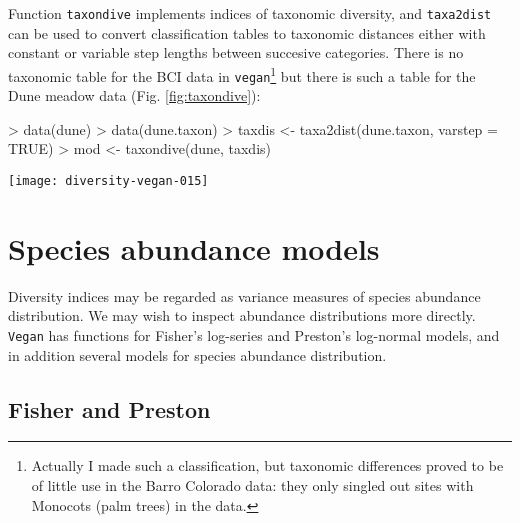 \documentclass[a4paper,10pt]{amsart}
\begin{document}
Function \texttt{taxondive} implements indices of taxonomic diversity,
and \texttt{taxa2dist} can be used to convert classification tables to
taxonomic distances either with constant or variable step lengths
between succesive categories. There is no taxonomic table for the BCI
data in \texttt{vegan}\footnote{Actually I made such a classification,
  but taxonomic differences proved to be of little use in the Barro
  Colorado data: they only singled out sites with Monocots (palm
  trees) in the data.}
but there is such a table for the Dune meadow data (Fig. \ref{fig:taxondive}):
\begin{Schunk}
\begin{Sinput}
> data(dune)
> data(dune.taxon)
> taxdis <- taxa2dist(dune.taxon, varstep = TRUE)
> mod <- taxondive(dune, taxdis)
\end{Sinput}
\end{Schunk}
\begin{SCfigure}
\texttt{[image: diversity-vegan-015]}
\caption{Taxonomic diversity $\Delta^+$ for the dune meadow data. The
  points are diversity values of single sites, and the funnel is their
  approximate confidence intervals ($2 \times$ standard error).}
\label{fig:taxondive}
\end{SCfigure}


\section{Species abundance models}

Diversity indices may be regarded as variance measures of species
abundance distribution.  We may wish to inspect abundance
distributions more directly.  \texttt{Vegan} has functions for
Fisher's log-series and Preston's log-normal models, and in addition
several models for species abundance distribution.

\subsection{Fisher and Preston}
\end{document}
